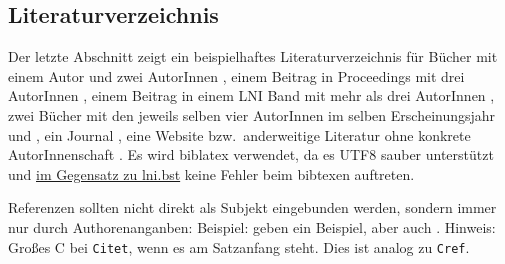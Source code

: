 \documentclass[utf8,biblatex]{lni}
\begin{document}
\subsection{Literaturverzeichnis}
Der letzte Abschnitt zeigt ein beispielhaftes Literaturverzeichnis für Bücher mit einem Autor \cite{Ez10} und zwei AutorInnen \cite{AB00}, einem Beitrag in Proceedings mit drei AutorInnen \cite{ABC01}, einem Beitrag in einem LNI Band mit mehr als drei AutorInnen \cite{Az09}, zwei Bücher mit den jeweils selben vier AutorInnen im selben Erscheinungsjahr \cite{Wa14} und \cite{Wa14b}, ein Journal \cite{Gl06}, eine Website \cite{GI19} bzw.\ anderweitige Literatur ohne konkrete AutorInnenschaft \cite{XX14}.
Es wird biblatex verwendet, da es UTF8 sauber unterstützt und \href{https://github.com/gi-ev/LNI/issues/5}{im Gegensatz zu lni.bst} keine Fehler beim bibtexen auftreten.

\newpage

Referenzen sollten nicht direkt als Subjekt eingebunden werden, sondern immer nur durch Authorenanganben:
Beispiel:  geben ein Beispiel, aber auch \citet{Az09}.
Hinweis: Großes C bei \texttt{Citet}, wenn es am Satzanfang steht. Dies ist analog zu \texttt{Cref}.
\end{document}
